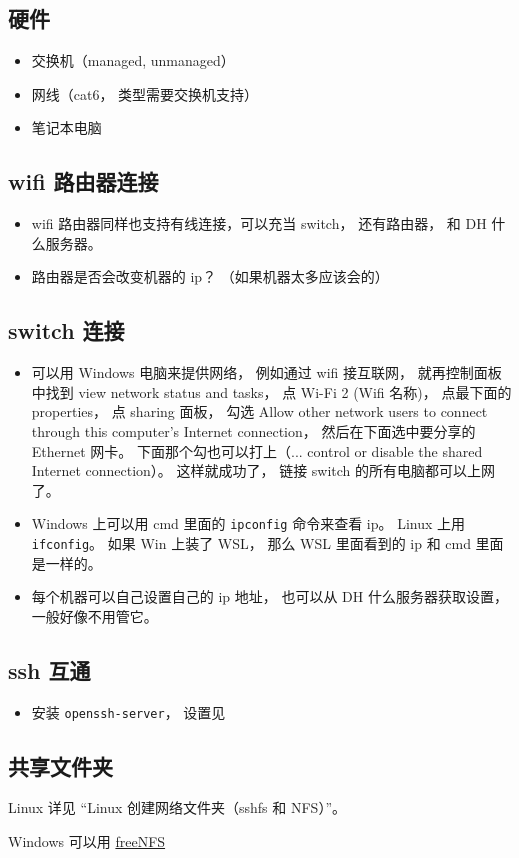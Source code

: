 
\begin{issues}
\issueDraft
\end{issues}

\subsection{硬件}
\begin{itemize}
\item 交换机（managed, unmanaged）
\item 网线（cat6， 类型需要交换机支持）
\item 笔记本电脑
\end{itemize}

\subsection{wifi 路由器连接}
\begin{itemize}
\item wifi 路由器同样也支持有线连接，可以充当 switch， 还有路由器， 和 DH 什么服务器。
\item 路由器是否会改变机器的 ip？ （如果机器太多应该会的）
\end{itemize}


\subsection{switch 连接}
\begin{itemize}
\item 可以用 Windows 电脑来提供网络， 例如通过 wifi 接互联网， 就再控制面板中找到 view network status and tasks， 点 Wi-Fi 2 (Wifi 名称)， 点最下面的 properties， 点 sharing 面板， 勾选 Allow other network users to connect through this computer's Internet connection， 然后在下面选中要分享的 Ethernet 网卡。 下面那个勾也可以打上（... control or disable the shared Internet connection）。 这样就成功了， 链接 switch 的所有电脑都可以上网了。
\item Windows 上可以用 cmd 里面的 \verb|ipconfig| 命令来查看 ip。 Linux 上用 \verb|ifconfig|。 如果 Win 上装了 WSL， 那么 WSL 里面看到的 ip 和 cmd 里面是一样的。
\item 每个机器可以自己设置自己的 ip 地址， 也可以从 DH 什么服务器获取设置， 一般好像不用管它。
\end{itemize}

\subsection{ssh 互通}
\begin{itemize}
\item 安装 \verb|openssh-server|， 设置见
\end{itemize}

\subsection{共享文件夹}
Linux 详见 “Linux 创建网络文件夹（sshfs 和 NFS）”。

Windows 可以用 \href{https://sourceforge.net/projects/freenfs/files/latest/download}{freeNFS}